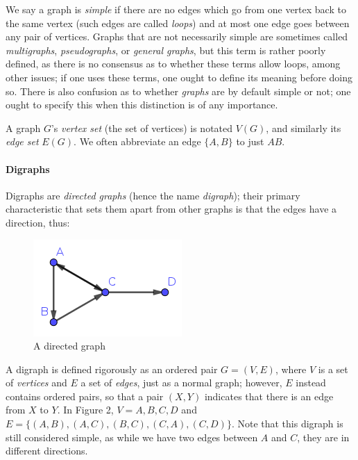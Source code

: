 We say a graph is \textit{simple} if there are no edges which go from one vertex back to the same vertex (such edges are called \textit{loops}) and at most one edge goes between any pair of vertices. Graphs that are not necessarily simple are sometimes called \textit{multigraphs}, \textit{pseudographs}, or \textit{general graphs}, but this term is rather poorly defined, as there is no consensus as to whether these terms allow loops, among other issues; if one uses these terms, one ought to define its meaning before doing so. There is also confusion as to whether \textit{graphs} are by default simple or not; one ought to specify this when this distinction is of any importance.

A graph \(G\)'s \textit{vertex set} (the set of vertices) is notated \(V(G)\), and similarly its \textit{edge set} \(E(G)\). We often abbreviate an edge \(\{A,B\}\) to just \(AB\).

\paragraph{Digraphs}

Digraphs are \textit{directed graphs} (hence the name \textit{digraph}); their primary characteristic that sets them apart from other graphs is that the edges have a direction, thus:



\begin{figure}[h]
\centering
\includegraphics{directedgraph.png}
\caption{A directed graph}
\label{directedgraph}
\end{figure}



A digraph is defined rigorously as an ordered pair \(G=(V,E)\), where \(V\) is a set of \textit{vertices} and \(E\) a set of \textit{edges}, just as a normal graph; however, \(E\) instead contains ordered pairs, so that a pair \((X,Y)\) indicates that there is an edge from \(X\) to \(Y\). In Figure 2, \(V={A,B,C,D}\) and \(E=\{(A,B),(A,C),(B,C),(C,A),(C,D)\}\). Note that this digraph is still considered simple, as while we have two edges between \(A\) and \(C\), they are in different directions.

